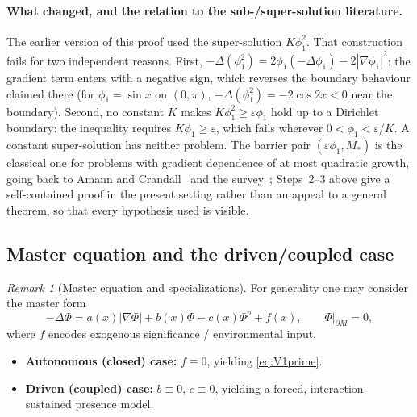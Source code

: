 \documentclass[11pt]{article}
\theoremstyle{plain}
\theoremstyle{definition}
\theoremstyle{remark}
\newtheorem{remark}[theorem]{Remark}
\begin{document}
\paragraph{What changed, and the relation to the sub-/super-solution literature.}
The earlier version of this proof used the super-solution \(K\phi_1^2\). That construction fails for two independent reasons. First, \(-\Delta(\phi_1^2)=2\phi_1(-\Delta\phi_1)-2|\nabla\phi_1|^2\): the gradient term enters with a negative sign, which reverses the boundary behaviour claimed there (for \(\phi_1=\sin x\) on \((0,\pi)\), \(-\Delta(\phi_1^2)=-2\cos 2x<0\) near the boundary). Second, no constant \(K\) makes \(K\phi_1^2\ge\varepsilon\phi_1\) hold up to a Dirichlet boundary: the inequality requires \(K\phi_1\ge\varepsilon\), which fails wherever \(0<\phi_1<\varepsilon/K\). A constant super-solution has neither problem. The barrier pair \((\varepsilon\phi_1,M_\ast)\) is the classical one for problems with gradient dependence of at most quadratic growth, going back to Amann and Crandall~\cite{AmannCrandall1978} and the survey~\cite{Amann1976}; Steps~2--3 above give a self-contained proof in the present setting rather than an appeal to a general theorem, so that every hypothesis used is visible.

\subsection{Master equation and the driven/coupled case}
\begin{remark}[Master equation and specializations]\label{rem:masterEquation}
For generality one may consider the master form
\[
-\Delta\Phi = a(x)|\nabla\Phi| + b(x)\Phi - c(x)\Phi^p + f(x),
\qquad \Phi|_{\partial M}=0,
\]
where \(f\) encodes exogenous significance / environmental input.
\begin{itemize}
\item \textbf{Autonomous (closed) case:} \(f\equiv 0\), yielding \eqref{eq:V1prime}.
\item \textbf{Driven (coupled) case:} \(b\equiv 0\), \(c\equiv 0\), yielding a forced, interaction-sustained presence model.
\end{itemize}
\end{remark}
\end{document}
